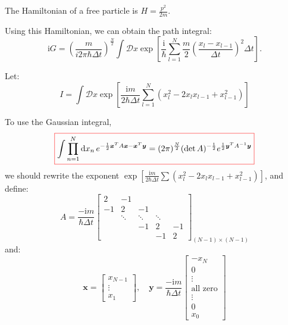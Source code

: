 \begin{example}
    The Hamiltonian of a free particle is $H = \frac{p^2}{2m}$.\

    Using this Hamiltonian, we can obtain the path integral:
    \begin{equation}
    \mathrm{i}G = \left( \frac{m}{i 2\pi\hbar\Delta t} \right)^{\frac{N}{2}} 
    \int \mathcal{D}x \exp\left[\frac{\mathrm{i}}{\hbar} \sum_{l=1}^N \frac{m}{2} (\frac{x_l-x_{l-1}}{\Delta t})^2 \Delta t \right].
    \end{equation}

    Let:
    \begin{equation}
    I = \int \mathcal{D}x \exp\left[\frac{\mathrm{i}m}{2\hbar\Delta t} \sum_{l=1}^N (x_l^2 - 2x_l x_{l-1} + x_{l-1}^2)\right]
    \end{equation}

    To use the Gaussian integral,
    \begin{equation}
        \colorboxed{
        \int \prod_{n=1}^N \mathrm{d}x_n \, e^{-\frac{1}{2}\bm{x}^T A \bm{x} - \bm{x}^T \bm{y}} 
        = (2\pi)^{\frac{N}{2}} (\det A)^{-\frac{1}{2}} e^{\frac{1}{2}\bm{y}^T A^{-1} \bm{y}}
        }
    \end{equation}
    we should rewrite the exponent $\exp[\frac{\mathrm{i}m}{2\hbar\Delta t} \sum (x_l^2-2x_l x_{l-1} + x_{l-1}^2)]$,
    and define:
    \begin{equation}
    A = \frac{-\mathrm{i}m}{\hbar\Delta t}
    \begin{bmatrix}
    2 & -1 & & \\
    -1 & 2 & -1 & \\
    & \ddots & \ddots & \ddots \\
    & & -1 & 2 & -1 \\
    & & & -1 & 2
    \end{bmatrix}_{(N-1)\times(N-1)}
    \end{equation}
    and:
    \begin{equation}
    \bm{x} = \begin{bmatrix} x_{N-1} \\ \vdots \\ x_1 \end{bmatrix},
    \quad
    \bm{y} = \frac{-\mathrm{i}m}{\hbar\Delta t}
    \begin{bmatrix}
    -x_N \\ 0 \\ \vdots \\ \text{all zero} \\ \vdots \\ 0 \\ x_0
    \end{bmatrix}
    \end{equation}


\end{example}
